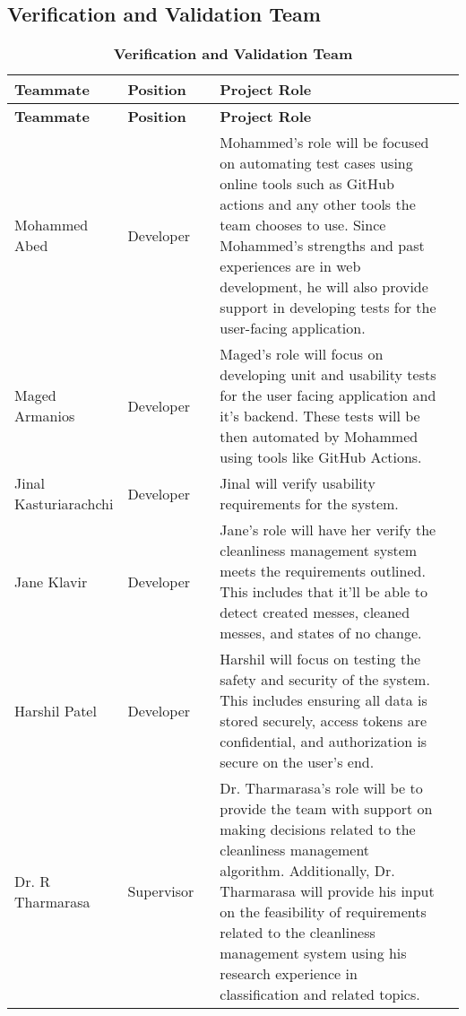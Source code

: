 \documentclass[12pt, titlepage]{article}
\begin{document}
\subsection{Verification and Validation Team}

\begin{longtable}{|>{\raggedright\arraybackslash}p{0.21\linewidth} | >{\raggedright\arraybackslash}p{0.21\linewidth} | >{\raggedright\arraybackslash}p{0.60\linewidth}| >{\raggedright\arraybackslash}p{0.21\linewidth}| }
    \caption{\bf Verification and Validation Team} \label{tab:my_label} \\
    
    \hline
    \textbf{Teammate} & \textbf{Position} & \textbf{Project Role}\\
    \hline
    \endfirsthead
    
    \hline
    \textbf{Teammate} & \textbf{Position} & \textbf{Project Role}\\
    \hline
    \endhead
    
    \hline
    \endfoot
    
    \hline
    \endlastfoot


    \hline
    Mohammed Abed & Developer & Mohammed's role will be focused on automating test cases using online tools such as GitHub actions and any other tools the team chooses to use. Since Mohammed's strengths and past experiences are in web development, he will also provide support in developing tests for the user-facing application. \\
   	\hline
    Maged Armanios & Developer & Maged's role will focus on developing unit and usability tests for the user facing application and it's backend. These tests will be then automated by Mohammed using tools like GitHub Actions. \\
    \hline
    Jinal Kasturiarachchi & Developer & Jinal will verify usability requirements for the system. \\
    \hline
    Jane Klavir & Developer & Jane's role will have her verify the cleanliness management system meets the requirements outlined. This includes that it'll be able to detect created messes, cleaned messes, and states of no change. \\
    \hline
    Harshil Patel & Developer & Harshil will focus on testing the safety and security of the system. This includes ensuring all data is stored securely, access tokens are confidential, and authorization is secure on the user's end.  \\
	\hline
	Dr. R Tharmarasa & Supervisor & Dr. Tharmarasa's role will be to provide the team with support on making decisions related to the cleanliness management algorithm. Additionally, Dr. Tharmarasa will provide his input on the feasibility of requirements related to the cleanliness management system using his research experience in classification and related topics.
\end{longtable}
\end{document}
